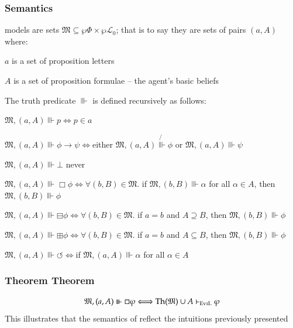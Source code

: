 \begin{frame}[allowframebreaks]
\frametitle{ Semantics}
\begin{itemizedot}
  \item {} models are sets $\mathfrak{M} \subseteq \wp \Phi
  \times \wp \mathcal{L}_0$; that is to say they are sets of pairs $(a, A)$
  where:
  \begin{itemizedot}
    \item $a$ is a set of proposition letters
    
    \item $A$ is a set of proposition formulae -- the agent's basic beliefs
  \end{itemizedot}
\end{itemizedot}
\framebreak
\begin{itemizedot}
  \item The  truth predicate $\Vvdash$ is defined recursively
  as follows:
  \begin{itemizedot}
    \item $\mathfrak{M}, (a, A) \Vvdash p \Longleftrightarrow p \in a$
    
    \item $\mathfrak{M}, (a, A) \Vvdash \phi \rightarrow \psi
    \Longleftrightarrow$either $\mathfrak{M}, (a, A) \not{\Vvdash} \phi$ or
    $\mathfrak{M}, (a, A) \Vvdash \psi$
    
    \item $\mathfrak{M}, (a, A) \Vvdash \bot$ never
    
    \item $\mathfrak{M}, (a, A) \Vvdash \Box  \phi \Longleftrightarrow \forall
    (b, B) \in \mathfrak{M} .$ if $\mathfrak{M}, (b, B) \Vvdash \alpha$ for
    all $\alpha \in A$, then $\mathfrak{M}, (b, B) \Vvdash \phi$
    
    \item $\mathfrak{M}, (a, A) \Vvdash \boxminus \phi \Longleftrightarrow
    \forall (b, B) \in \mathfrak{M} .$ if $a = b$ and $A \supseteq B$, then
    $\mathfrak{M}, (b, B) \Vvdash \phi$
    
    \item $\mathfrak{M}, (a, A) \Vvdash \boxplus \phi \Longleftrightarrow
    \forall (b, B) \in \mathfrak{M} .$ if $a = b$ and $A \subseteq B$, then
    $\mathfrak{M}, (b, B) \Vvdash \phi$
    
    \item $\mathfrak{M}, (a, A) \Vvdash \circlearrowleft
    \Longleftrightarrow$if $\mathfrak{M}, (a, A) \Vvdash \alpha$ for all
    $\alpha \in A$
  \end{itemizedot}
\end{itemizedot}
\end{frame}
\begin{frame}
\frametitle{Theorem Theorem}
\[ \mathfrak{M}, (a, A) \Vvdash \Box  \varphi \Longleftrightarrow \operatorname{Th} (
   \mathfrak{M}) \cup A \vdash_{\text{{\scshape{EviL}}}} \varphi \]
This illustrates that the semantics of  reflect the intuitions
previously presented
\end{frame}


